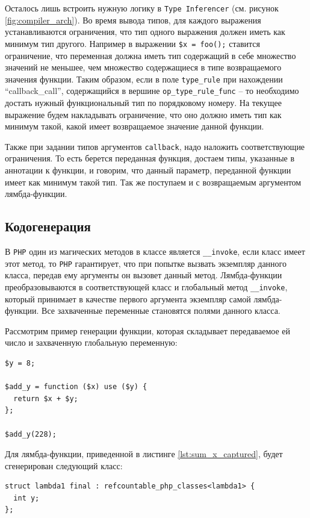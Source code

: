 Осталось лишь встроить нужную логику в \verb|Type Inferencer| (см. рисунок \ref{fig:compiler_arch}).
Во время вывода типов, для каждого выражения устанавливаются ограничения, что тип одного выражения должен иметь как минимум тип другого.
Например в выражении \verb|$x = foo();| ставится ограничение, что переменная должна иметь тип содержащий в себе множество значений не меньшее, чем множество содержащиеся в типе возвращаемого значения функции.
Таким образом, если в поле \verb|type_rule| при нахождении ``callback\_call'', содержащийся в вершине \verb|op_type_rule_func| -- то необходимо достать нужный функциональный тип по порядковому номеру.
На текущее выражение будем накладывать ограничение, что оно должно иметь тип как минимум такой, какой имеет возвращаемое значение данной функции.

Также при задании типов аргументов \verb|callback|, надо наложить соответствующие ограничения.
То есть берется переданная функция, достаем типы, указанные в аннотации к функции, и говорим, что данный параметр, переданной функции имеет как минимум такой тип.
Так же поступаем и с возвращаемым аргументом лямбда-функции.

\subsection{Кодогенерация}
В \verb|PHP| один из магических методов в классе является \verb|__invoke|, если класс имеет этот метод, то \verb|PHP| гарантирует, что при попытке вызвать экземпляр данного класса, передав ему аргументы он вызовет данный метод.
Лямбда-функции преобразовываются в соответствующей класс и глобальный метод \verb|__invoke|, который принимает в качестве первого аргумента экземпляр самой лямбда-функции.
Все захваченные переменные становятся полями данного класса.

Рассмотрим пример генерации функции, которая складывает передаваемое ей число и захваченную глобальную переменную:
\begin{lstlisting}[label={lst:sum_x_captured},caption={Пример функции, добавляющей к аргументу захваченное значение}]
$y = 8;

$add_y = function ($x) use ($y) {
  return $x + $y;
};

$add_y(228);
\end{lstlisting}

Для лямбда-функции, приведенной в листинге \ref{lst:sum_x_captured}, будет сгенерирован следующий класс:
\begin{lstlisting}
struct lambda1 final : refcountable_php_classes<lambda1> {
  int y;
};
\end{lstlisting}

